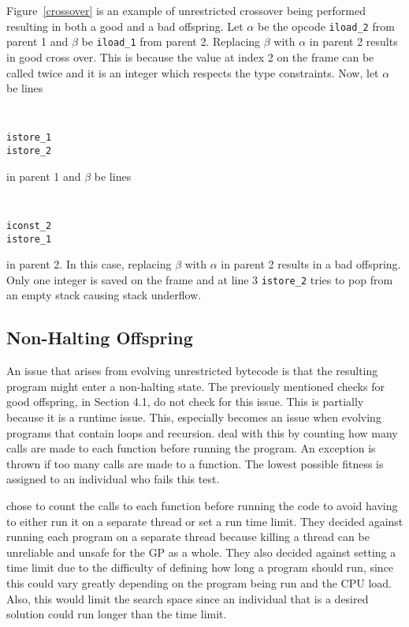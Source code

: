 \documentclass{sig-alternate}
\begin{document}
Figure~\ref{crossover} is an example of unrestricted crossover being performed resulting in both a good and a bad offspring. Let $\alpha$ be the opcode \texttt{iload\_2} from parent 1 and $\beta$ be \texttt{iload\_1} from parent 2. Replacing $\beta$ with $\alpha$ in parent 2 results in good cross over. This is because the value at index 2 on the frame can be called twice and it is an integer which respects the type constraints. Now, let $\alpha$ be lines 
{\tt
\begin{verbatim}
istore_1
istore_2
\end{verbatim}}

in parent 1 and $\beta$ be lines 
{\tt
\begin{verbatim}
iconst_2
istore_1
\end{verbatim}}
in parent 2. In this case, replacing $\beta$ with $\alpha$ in parent 2 results in a bad offspring. Only one integer is saved on the frame and at line 3 \texttt{istore\_2} tries to pop from an empty stack causing stack underflow.

\subsection{Non-Halting Offspring}
An issue that arises from evolving unrestricted bytecode is that the resulting program might enter a non-halting state. The previously mentioned checks for good offspring, in Section 4.1, do not check for this issue. This is partially because it is a runtime issue. This, especially becomes an issue when evolving programs that contain loops and recursion.
\cite{FINCH:2011} deal with this by counting how many calls are made to each function before running the program. An exception is thrown if too many calls are made to a function. The lowest possible fitness is assigned to an individual who fails this test.\par

\cite{FINCH:2011} chose to count the calls to each function before running the code to avoid having to either run it on a separate thread or set a run time limit. They decided against running each program on a separate thread because killing a thread can be unreliable and unsafe for the GP as a whole. They also decided against setting a time limit due to the difficulty of defining how long a program should run, since this could vary greatly depending on the program being run and the CPU load. Also, this would limit the search space since an individual that is a desired solution could run longer than the time limit.
\end{document}
